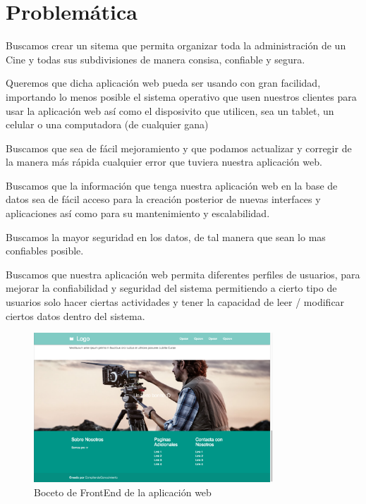\documentclass[11pt, fleqn]{article}                             %
\begin{document}
\clearpage
\section{Problemática}
    
    Buscamos crear un sitema que permita organizar toda la administración de un Cine y todas
    sus subdivisiones de manera consisa, confiable y segura.

    Queremos que dicha aplicación web pueda ser usando con gran facilidad, importando lo menos posible
    el sistema operativo que usen nuestros clientes para usar la aplicación web así como el
    disposivito que utilicen, sea un tablet, un celular o una computadora (de cualquier gana)

    Buscamos que sea de fácil mejoramiento y que podamos actualizar y corregir de la manera más rápida
    cualquier error que tuviera nuestra aplicación web.

    Buscamos que la información que tenga nuestra aplicación web en la base de datos sea de fácil acceso
    para la creación posterior de nuevas interfaces y aplicaciones así como para su mantenimiento
    y escalabilidad.

    Buscamos la mayor seguridad en los datos, de tal manera que sean lo mas confiables posible.

    Buscamos que nuestra aplicación web permita diferentes perfiles de usuarios, para mejorar la confiabilidad
    y seguridad del sistema permitiendo a cierto tipo de usuarios solo hacer ciertas actividades y 
    tener la capacidad de leer / modificar ciertos datos dentro del sistema.



    \begin{figure}[h!]
        \centering
        \includegraphics[width=0.80\textwidth]{Examples2.png}
        \caption{Boceto de FrontEnd de la aplicación web}
    \end{figure}
\end{document}
